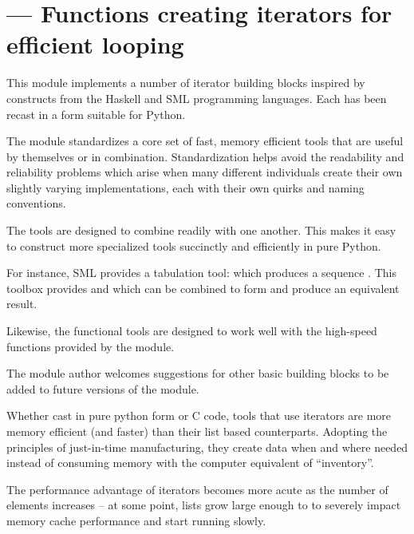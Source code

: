 \section{ ---
         Functions creating iterators for efficient looping}



This module implements a number of iterator building blocks inspired
by constructs from the Haskell and SML programming languages.  Each
has been recast in a form suitable for Python.

The module standardizes a core set of fast, memory efficient tools
that are useful by themselves or in combination.  Standardization helps
avoid the readability and reliability problems which arise when many
different individuals create their own slightly varying implementations,
each with their own quirks and naming conventions.

The tools are designed to combine readily with one another.  This makes
it easy to construct more specialized tools succinctly and efficiently
in pure Python.

For instance, SML provides a tabulation tool: 
which produces a sequence .  This toolbox
provides  and  which can be combined
to form  and produce an equivalent result.

Likewise, the functional tools are designed to work well with the
high-speed functions provided by the  module.

The module author welcomes suggestions for other basic building blocks
to be added to future versions of the module.

Whether cast in pure python form or C code, tools that use iterators
are more memory efficient (and faster) than their list based counterparts.
Adopting the principles of just-in-time manufacturing, they create
data when and where needed instead of consuming memory with the
computer equivalent of ``inventory''.

The performance advantage of iterators becomes more acute as the number
of elements increases -- at some point, lists grow large enough to
to severely impact memory cache performance and start running slowly.

